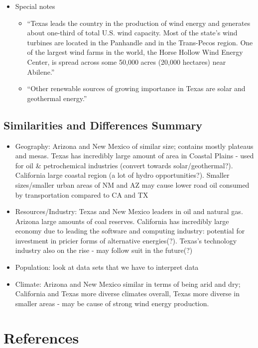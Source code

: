 \documentclass[9pt,twocolumn,twoside]{pnas-new}
\begin{document}
\begin{itemize}
\item Special notes
\begin{itemize}
\item “Texas leads the country in the production of wind energy and generates about one-third of total U.S. wind capacity. Most of the state’s wind turbines are located in the Panhandle and in the Trans-Pecos region. One of the largest wind farms in the world, the Horse Hollow Wind Energy Center, is spread across some 50,000 acres (20,000 hectares) near Abilene.”
\item “Other renewable sources of growing importance in Texas are solar and geothermal energy.”

\end{itemize}

\end{itemize}

\subsection*{Similarities and Differences Summary}
\begin{itemize}
\item Geography: Arizona and New Mexico of similar size; contains mostly plateaus and mesas. Texas has incredibly large amount of area in Coastal Plains - used for oil \& petrochemical industries (convert towards solar/geothermal?). California large coastal region (a lot of hydro opportunities?). Smaller sizes/smaller urban areas of NM and AZ may cause lower road oil consumed by transportation compared to CA and TX

\item Resources/Industry: Texas and New Mexico leaders in oil and natural gas. Arizona large amounts of coal reserves. California has incredibly large economy due to leading the software and computing industry: potential for investment in pricier forms of alternative energies(?). Texas's technology industry also on the rise - may follow suit in the future(?)

\item Population: look at data sets that we have to interpret data

\item Climate: Arizona and New Mexico similar in terms of being arid and dry; California and Texas more diverse climates overall, Texas more diverse in smaller areas - may be cause of strong wind energy production.
\end{itemize}

\section*{References}
\end{document}
